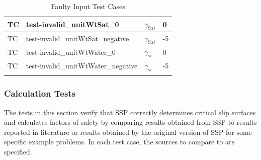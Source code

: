 \documentclass[12pt, titlepage]{article}
\newcounter{testnum} %
\newcommand{\progname}{SSP}
\begin{document}
\begin{longtable}{  l  p{5cm}  l  p{5cm}  }
	\hline
	TC{testnum}\thetestnum \label{TC_InvalidUnitWtSat0} & 
	test-invalid\_unitWtSat\_0 & $\gamma_\text{Sat}$ & 0\\ 
	\hline
	TC{testnum}\thetestnum \label{TC_InvalidUnitWtSatNegative} & 
	test-invalid\_unitWtSat\_negative & $\gamma_\text{Sat}$ & -5\\ 
	\hline
	TC{testnum}\thetestnum \label{TC_InvalidUnitWtWater0} & 
	test-invalid\_unitWtWater\_0 & $\gamma_\text{w}$ & 0\\ 
	\hline
	TC{testnum}\thetestnum \label{TC_InvalidUnitWtWaterNegative} 
	& test-invalid\_unitWtWater\_negative & $\gamma_\text{w}$ & -5\\ 
	\hline
	\caption{Faulty Input Test Cases}
	\label{FaultyInputTests}
\end{longtable}

\subsubsection{Calculation Tests}

The tests in this section verify that \progname{} correctly determines critical 
slip surfaces and calculates factors of safety by comparing results obtained 
from \progname{} to results reported in literature or results obtained by the 
original version of \progname{} for some specific example problems. In each 
test case, the sources to compare to are specified.
\end{document}
